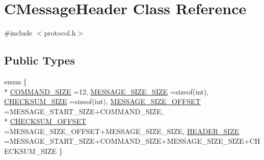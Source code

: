 \hypertarget{class_c_message_header}{}\section{C\+Message\+Header Class Reference}
\label{class_c_message_header}


{\ttfamily \#include $<$protocol.\+h$>$}

\subsection*{Public Types}
\begin{DoxyCompactItemize}
\item 
enum \{ \\*
\hyperlink{class_c_message_header_a00659410ff6010c972826dc3020e18b1a8c1bfc0fa6a63c8b73abef30555a5e54}{C\+O\+M\+M\+A\+N\+D\+\_\+\+S\+I\+Z\+E} =12, 
\hyperlink{class_c_message_header_a00659410ff6010c972826dc3020e18b1a223ee9c2e0e31d0afe31c713b41400d2}{M\+E\+S\+S\+A\+G\+E\+\_\+\+S\+I\+Z\+E\+\_\+\+S\+I\+Z\+E} =sizeof(int), 
\hyperlink{class_c_message_header_a00659410ff6010c972826dc3020e18b1ac92b66287a05d5c96bf494ff5a48e726}{C\+H\+E\+C\+K\+S\+U\+M\+\_\+\+S\+I\+Z\+E} =sizeof(int), 
\hyperlink{class_c_message_header_a00659410ff6010c972826dc3020e18b1a73cc507b1a2c32fba10305201e40f2b3}{M\+E\+S\+S\+A\+G\+E\+\_\+\+S\+I\+Z\+E\+\_\+\+O\+F\+F\+S\+E\+T} =M\+E\+S\+S\+A\+G\+E\+\_\+\+S\+T\+A\+R\+T\+\_\+\+S\+I\+Z\+E+\+C\+O\+M\+M\+A\+N\+D\+\_\+\+S\+I\+Z\+E, 
\\*
\hyperlink{class_c_message_header_a00659410ff6010c972826dc3020e18b1ad4e76479ab116367800a146dbb299393}{C\+H\+E\+C\+K\+S\+U\+M\+\_\+\+O\+F\+F\+S\+E\+T} =M\+E\+S\+S\+A\+G\+E\+\_\+\+S\+I\+Z\+E\+\_\+\+O\+F\+F\+S\+E\+T+\+M\+E\+S\+S\+A\+G\+E\+\_\+\+S\+I\+Z\+E\+\_\+\+S\+I\+Z\+E, 
\hyperlink{class_c_message_header_a00659410ff6010c972826dc3020e18b1add8582d526addef583c978e5261dfec1}{H\+E\+A\+D\+E\+R\+\_\+\+S\+I\+Z\+E} =M\+E\+S\+S\+A\+G\+E\+\_\+\+S\+T\+A\+R\+T\+\_\+\+S\+I\+Z\+E+\+C\+O\+M\+M\+A\+N\+D\+\_\+\+S\+I\+Z\+E+\+M\+E\+S\+S\+A\+G\+E\+\_\+\+S\+I\+Z\+E\+\_\+\+S\+I\+Z\+E+\+C\+H\+E\+C\+K\+S\+U\+M\+\_\+\+S\+I\+Z\+E
 \}
\end{DoxyCompactItemize}
